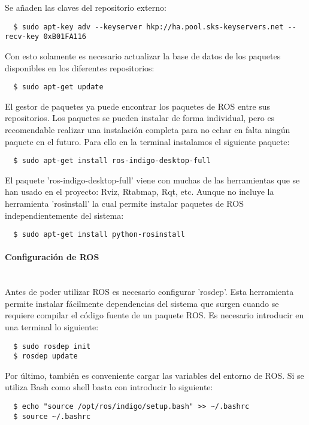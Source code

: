Se añaden las claves del repositorio externo:
\\
\begin{lstlisting}
  $ sudo apt-key adv --keyserver hkp://ha.pool.sks-keyservers.net --recv-key 0xB01FA116
\end{lstlisting}

Con esto solamente es necesario actualizar la base de datos de los paquetes
disponibles en los diferentes repositorios:
\\
\begin{lstlisting}
  $ sudo apt-get update
\end{lstlisting}

El gestor de paquetes ya puede encontrar los paquetes de ROS entre sus
repositorios. Los paquetes se pueden instalar de forma individual, pero es
recomendable realizar una instalación completa para no echar en falta ningún
paquete en el futuro. Para ello en la terminal instalamos el siguiente paquete:
\\
\begin{lstlisting}
  $ sudo apt-get install ros-indigo-desktop-full
\end{lstlisting}

El paquete 'ros-indigo-desktop-full' viene con muchas de las herramientas que se
han usado en el proyecto: Rviz, Rtabmap, Rqt, etc. Aunque no incluye la
herramienta 'rosinstall' la cual permite instalar paquetes de ROS
independientemente del sistema:
\\
\begin{lstlisting}
  $ sudo apt-get install python-rosinstall
\end{lstlisting}

\paragraph{Configuración de ROS} \hspace{0pt} \\

Antes de poder utilizar ROS es necesario configurar 'rosdep'. Esta herramienta
permite instalar fácilmente dependencias del sistema que surgen cuando se
requiere compilar el código fuente de un paquete ROS. Es necesario introducir en
una terminal lo siguiente:
\\
\begin{lstlisting}
  $ sudo rosdep init
  $ rosdep update
\end{lstlisting}

Por último, también es conveniente cargar las variables del entorno de ROS. Si
se utiliza Bash como shell basta con introducir lo siguiente:
\\
\begin{lstlisting}
  $ echo "source /opt/ros/indigo/setup.bash" >> ~/.bashrc
  $ source ~/.bashrc
\end{lstlisting}


